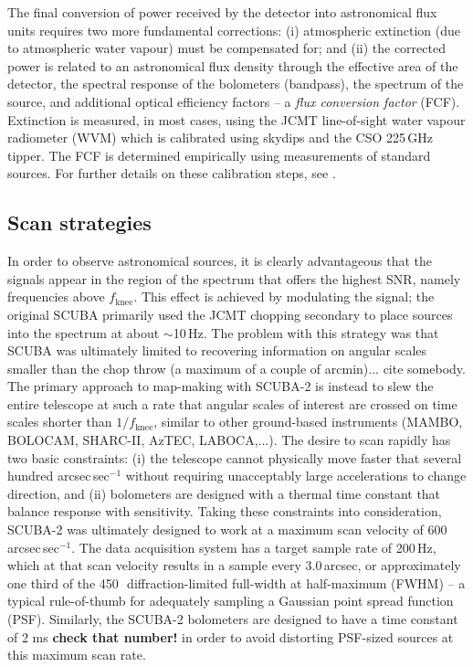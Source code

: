\documentclass[useAMS,usenatbib,nofootinbib]{mn2e}
\newcommand{\snr}{SNR}
\begin{document}
The final conversion of power received by the detector into
astronomical flux units requires two more fundamental corrections: (i)
atmospheric extinction (due to atmospheric water vapour) must be
compensated for; and (ii) the corrected power is related to an
astronomical flux density through the effective area of the detector,
the spectral response of the bolometers (bandpass), the spectrum of
the source, and additional optical efficiency factors -- a \emph{flux
  conversion factor} (FCF). Extinction is measured, in most cases,
using the JCMT line-of-sight water vapour radiometer (WVM) which is
calibrated using skydips and the CSO 225\,GHz tipper. The FCF is
determined empirically using measurements of standard sources. For
further details on these calibration steps, see \citet{dempsey2011}.

\subsection{Scan strategies}
\label{sec:scan}

In order to observe astronomical sources, it is clearly advantageous
that the signals appear in the region of the spectrum that offers the
highest \snr, namely frequencies above $f_\mathrm{knee}$. This effect
is achieved by modulating the signal; the original SCUBA primarily
used the JCMT chopping secondary to place sources into the spectrum at
about $\sim$10\,Hz. The problem with this strategy was that SCUBA was
ultimately limited to recovering information on angular scales smaller
than the chop throw (a maximum of a couple of arcmin)... cite
somebody. The primary approach to map-making with SCUBA-2 is instead
to slew the entire telescope at such a rate that angular scales of
interest are crossed on time scales shorter than $1/f_\mathrm{knee}$,
similar to other ground-based instruments (MAMBO, BOLOCAM, SHARC-II,
AzTEC, LABOCA,...). The desire to scan rapidly has two basic
constraints: (i) the telescope cannot physically move faster that
several hundred arcsec\,sec$^{-1}$ without requiring unacceptably
large accelerations to change direction, and (ii) bolometers are
designed with a thermal time constant that balance response with
sensitivity. Taking these constraints into consideration, SCUBA-2 was
ultimately designed to work at a maximum scan velocity of
600\,arcsec\,sec$^{-1}$. The data acquisition system has a target
sample rate of 200\,Hz, which at that scan velocity results in a
sample every 3.0\,arcsec, or approximately one third of the
450\,\micron\ diffraction-limited full-width at half-maximum (FWHM) --
a typical rule-of-thumb for adequately sampling a Gaussian point
spread function (PSF). Similarly, the SCUBA-2 bolometers are designed
to have a time constant of 2 ms \textbf{check that number!} in order
to avoid distorting PSF-sized sources at this maximum scan rate.
\end{document}

